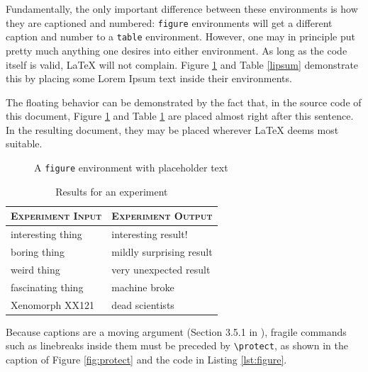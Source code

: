 \documentclass[article,a4paper,oneside,10pt]{memoir}
\begin{document}
Fundamentally, the only important difference between these environments is how
they  are  captioned  and  numbered: \verb|figure|  environments  will  get  a
different caption and  number to a \verb|table|  environment. However, one may
in principle put pretty much  anything one desires into either environment. As
long  as  the  code  itself  is  valid,  \LaTeX{}  will  not  complain. Figure
\ref{fig:lipsum} and Table \ref{lipsum} demonstrate this by placing some Lorem
Ipsum text inside their environments.

The floating behavior can be demonstrated by the fact that, in the source code
of this  document, Figure \ref{fig:lipsum} and  Table \ref{tab:experiment} are
placed almost right  after this sentence. In the resulting  document, they may
be placed  wherever \LaTeX{}  deems most  suitable\footnotemark.



\begin{figure}
    {\color{gray}\centering\small\lipsum[2]}
    \caption{A \texttt{figure} environment with placeholder text}
    \label{fig:lipsum}
\end{figure}

\begin{table}
    \centering
    \caption{Results for an experiment}
    \label{tab:experiment}
    \begin{tabular}{ll}
        \toprule
        \scshape Experiment Input & \scshape Experiment Output \\
        \midrule
        interesting thing         & interesting result!        \\
        boring thing              & mildly surprising result   \\
        weird thing               & very unexpected result     \\
        fascinating thing         & machine broke              \\
        Xenomorph XX121           & dead scientists            \\
        \bottomrule
    \end{tabular}
\end{table}


Because  captions are  a moving  argument (Section  3.5.1 in  \cite{lamport}),
fragile  commands  such  as  linebreaks   inside  them  must  be  preceded  by
\verb|\protect|, as shown  in the caption of Figure  \ref{fig:protect} and the
code in Listing \ref{lst:figure}.
\end{document}
